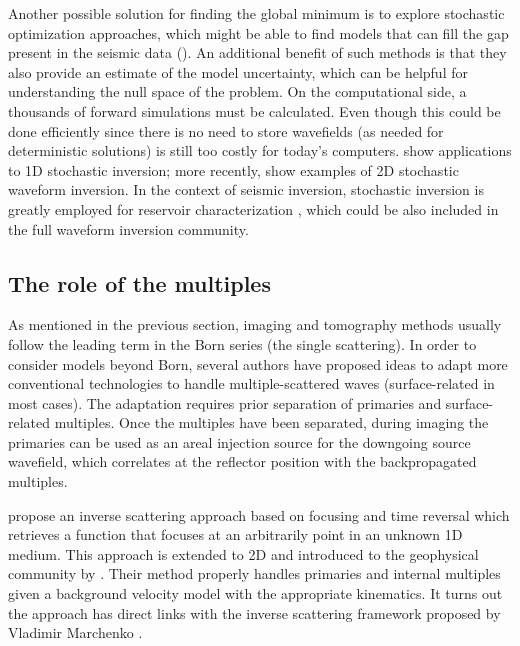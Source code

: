 Another possible solution for finding the global minimum is to
explore stochastic optimization approaches, which might be able
to find models that can fill the gap present in the seismic data
(). An additional benefit of such methods is that
they also provide an estimate of the model uncertainty, which can
be helpful for understanding the null space of the problem. On
the computational side, a thousands of forward simulations must
be calculated. Even though this could be done efficiently since
there is no need to store wavefields (as needed for deterministic
solutions) is still too costly for today's computers. \cite{Sen91}
show applications to 1D stochastic inversion; more recently,
\cite{stochasticPisa,SenWorkshop} show examples of 2D stochastic
waveform inversion. In the context of seismic inversion, stochastic
inversion is greatly employed for reservoir characterization
\citep{boschReview}, which could be also included in the full
waveform inversion community.

\subsection{The role of the multiples}

As mentioned in the previous section, imaging and tomography methods
usually follow the leading term in the Born series (the single
scattering). In order to consider models beyond Born, several authors
\citep{GuittonAreal,grion2007mirror,VerschuurMultiples,DanWhitmore,Ma
ndy} have proposed ideas to adapt more conventional technologies to
handle multiple-scattered waves (surface-related in most cases). The
adaptation requires prior separation of primaries and surface-related
multiples. Once the multiples have been separated, during imaging the
primaries can be used as an areal injection source for the downgoing
source wavefield, which correlates at the reflector position with the
backpropagated multiples.

\cite{rose2002,rose2002single} propose an inverse scattering approach
based on focusing and time reversal which retrieves a function
that focuses at an arbitrarily point in an unknown 1D medium.
This approach is extended to 2D and introduced to the geophysical
community by \cite{Fil2012}. Their method properly handles primaries
and internal multiples given a background velocity model with the
appropriate kinematics. It turns out the approach has direct links
with the inverse scattering framework proposed by Vladimir Marchenko
\citep{marchenko2011sturm}.

